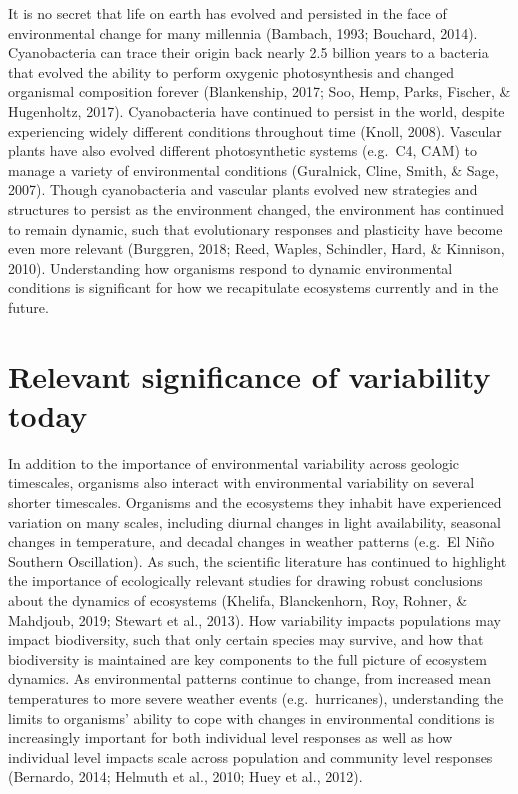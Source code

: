\documentclass[12pt,twoside]{reedthesis}
\begin{document}
It is no secret that life on earth has evolved and persisted in the face of environmental change for many millennia (Bambach, 1993; Bouchard, 2014). Cyanobacteria can trace their origin back nearly 2.5 billion years to a bacteria that evolved the ability to perform oxygenic photosynthesis and changed organismal composition forever (Blankenship, 2017; Soo, Hemp, Parks, Fischer, \& Hugenholtz, 2017). Cyanobacteria have continued to persist in the world, despite experiencing widely different conditions throughout time (Knoll, 2008). Vascular plants have also evolved different photosynthetic systems (e.g.~C4, CAM) to manage a variety of environmental conditions (Guralnick, Cline, Smith, \& Sage, 2007). Though cyanobacteria and vascular plants evolved new strategies and structures to persist as the environment changed, the environment has continued to remain dynamic, such that evolutionary responses and plasticity have become even more relevant (Burggren, 2018; Reed, Waples, Schindler, Hard, \& Kinnison, 2010). Understanding how organisms respond to dynamic environmental conditions is significant for how we recapitulate ecosystems currently and in the future.

\hypertarget{relevant-significance-of-variability-today}{%
\section{Relevant significance of variability today}\label{relevant-significance-of-variability-today}}

In addition to the importance of environmental variability across geologic timescales, organisms also interact with environmental variability on several shorter timescales. Organisms and the ecosystems they inhabit have experienced variation on many scales, including diurnal changes in light availability, seasonal changes in temperature, and decadal changes in weather patterns (e.g.~El Niño Southern Oscillation). As such, the scientific literature has continued to highlight the importance of ecologically relevant studies for drawing robust conclusions about the dynamics of ecosystems (Khelifa, Blanckenhorn, Roy, Rohner, \& Mahdjoub, 2019; Stewart et al., 2013). How variability impacts populations may impact biodiversity, such that only certain species may survive, and how that biodiversity is maintained are key components to the full picture of ecosystem dynamics. As environmental patterns continue to change, from increased mean temperatures to more severe weather events (e.g.~hurricanes), understanding the limits to organisms' ability to cope with changes in environmental conditions is increasingly important for both individual level responses as well as how individual level impacts scale across population and community level responses (Bernardo, 2014; Helmuth et al., 2010; Huey et al., 2012).
\end{document}
